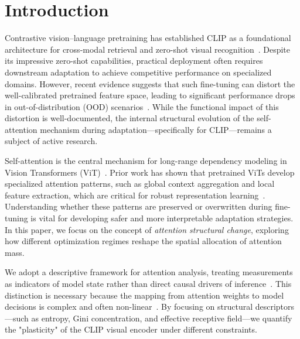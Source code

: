 \documentclass[ai,article,submit,pdftex,oneauthor]{Definitions/mdpi}
\begin{document}
\section{Introduction}
Contrastive vision--language pretraining has established CLIP as a foundational architecture for cross-modal retrieval and zero-shot visual recognition~\cite{radford2021learning,shao2023vlm}. Despite its impressive zero-shot capabilities, practical deployment often requires downstream adaptation to achieve competitive performance on specialized domains. However, recent evidence suggests that such fine-tuning can distort the well-calibrated pretrained feature space, leading to significant performance drops in out-of-distribution (OOD) scenarios~\cite{kumar2022finetuning,wortsman2022robust}. While the functional impact of this distortion is well-documented, the internal structural evolution of the self-attention mechanism during adaptation—specifically for CLIP—remains a subject of active research.

Self-attention is the central mechanism for long-range dependency modeling in Vision Transformers (ViT)~\cite{vaswani2017attention,dosovitskiy2021image}. Prior work has shown that pretrained ViTs develop specialized attention patterns, such as global context aggregation and local feature extraction, which are critical for robust representation learning~\cite{raghu2021vision,caron2021emerging}. Understanding whether these patterns are preserved or overwritten during fine-tuning is vital for developing safer and more interpretable adaptation strategies. In this paper, we focus on the concept of \emph{attention structural change}, exploring how different optimization regimes reshape the spatial allocation of attention mass.

We adopt a descriptive framework for attention analysis, treating measurements as indicators of model state rather than direct causal drivers of inference~\cite{wiegreffe2019attention,chefer2021transformer}. This distinction is necessary because the mapping from attention weights to model decisions is complex and often non-linear~\cite{jain2019attention}. By focusing on structural descriptors—such as entropy, Gini concentration, and effective receptive field—we quantify the "plasticity" of the CLIP visual encoder under different constraints.
\end{document}
